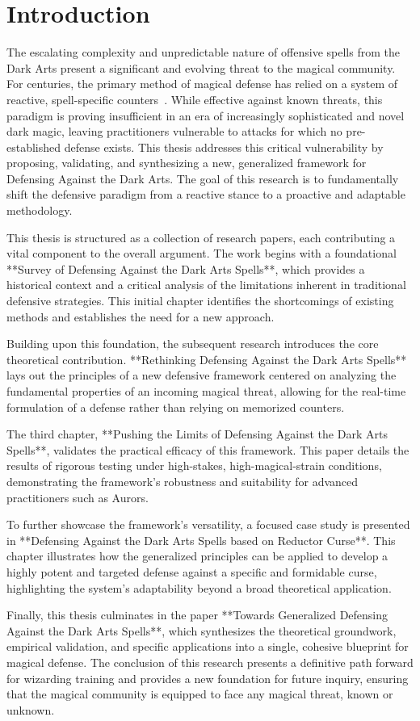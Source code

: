 \chapter{Introduction}
The escalating complexity and unpredictable nature of offensive spells from the Dark Arts present a significant and evolving threat to the magical community. For centuries, the primary method of magical defense has relied on a system of reactive, spell-specific counters~\cite{survey2025magic}. While effective against known threats, this paradigm is proving insufficient in an era of increasingly sophisticated and novel dark magic, leaving practitioners vulnerable to attacks for which no pre-established defense exists. This thesis addresses this critical vulnerability by proposing, validating, and synthesizing a new, generalized framework for Defensing Against the Dark Arts. The goal of this research is to fundamentally shift the defensive paradigm from a reactive stance to a proactive and adaptable methodology.

This thesis is structured as a collection of research papers, each contributing a vital component to the overall argument. The work begins with a foundational **Survey of Defensing Against the Dark Arts Spells**, which provides a historical context and a critical analysis of the limitations inherent in traditional defensive strategies. This initial chapter identifies the shortcomings of existing methods and establishes the need for a new approach.

Building upon this foundation, the subsequent research introduces the core theoretical contribution. **Rethinking Defensing Against the Dark Arts Spells** lays out the principles of a new defensive framework centered on analyzing the fundamental properties of an incoming magical threat, allowing for the real-time formulation of a defense rather than relying on memorized counters.

The third chapter, **Pushing the Limits of Defensing Against the Dark Arts Spells**, validates the practical efficacy of this framework. This paper details the results of rigorous testing under high-stakes, high-magical-strain conditions, demonstrating the framework's robustness and suitability for advanced practitioners such as Aurors.

To further showcase the framework's versatility, a focused case study is presented in **Defensing Against the Dark Arts Spells based on Reductor Curse**. This chapter illustrates how the generalized principles can be applied to develop a highly potent and targeted defense against a specific and formidable curse, highlighting the system's adaptability beyond a broad theoretical application.

Finally, this thesis culminates in the paper **Towards Generalized Defensing Against the Dark Arts Spells**, which synthesizes the theoretical groundwork, empirical validation, and specific applications into a single, cohesive blueprint for magical defense. The conclusion of this research presents a definitive path forward for wizarding training and provides a new foundation for future inquiry, ensuring that the magical community is equipped to face any magical threat, known or unknown.

